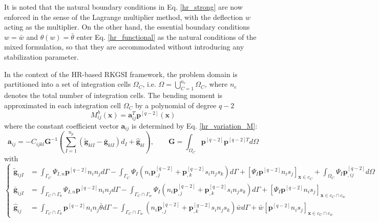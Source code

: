 It is noted that the natural boundary conditions in Eq. \eqref{hr_strong} are now enforced in the sense of the Lagrange multiplier method, with the deflection $w$ acting as the multiplier.
On the other hand, the essential boundary conditions $w=\bar w$ and $\theta(w)=\bar\theta$ enter Eq. \eqref{hr_functional} as the natural conditions of the mixed formulation, so that they are accommodated without introducing any stabilization parameter.

In the context of the HR-based RKGSI framework, the problem domain is partitioned into a set of integration cells $\Omega_C$, i.e. $\Omega=\bigcup_{C=1}^{n_e}\Omega_C$, where $n_e$ denotes the total number of integration cells.
The bending moment is approximated in each integration cell $\Omega_C$ by a polynomial of degree $q-2$
\begin{equation}\label{moment_approx}
	M^h_{ij}(\boldsymbol x)=\boldsymbol a_{ij}^{T}\boldsymbol p^{[q-2]}(\boldsymbol x)
\end{equation}
where the constant coefficient vector $\boldsymbol a_{ij}$ is determined by Eq. \eqref{hr_variation_M}:
\begin{equation}\label{moment_coef}
	\boldsymbol a_{ij}=-C_{ijkl}\boldsymbol G^{-1}\left(\sum_{I=1}^{n_p}\left(\tilde{\boldsymbol g}_{klI}-\bar{\boldsymbol g}_{klI}\right)d_I+\hat{\boldsymbol g}_{kl}\right),\qquad
	\boldsymbol G=\int_{\Omega_C}\boldsymbol p^{[q-2]}\boldsymbol p^{[q-2]T}d\Omega
\end{equation}
with
\begin{equation}\label{g_ij}
	\left\{
	\begin{aligned}
		\tilde{\boldsymbol g}_{ijI}&=\int_{\Gamma_C}\Psi_{I,n}\boldsymbol p^{[q-2]} n_i n_j d\Gamma
		-\int_{\Gamma_C}\Psi_I\left(n_i\boldsymbol p^{[q-2]}_{,j}+\boldsymbol p^{[q-2]}_{,k}s_i n_j s_k\right)d\Gamma
		+\left[\Psi_I\boldsymbol p^{[q-2]} n_i s_j\right]_{\boldsymbol x\in c_C}
		+\int_{\Omega_C}\Psi_I\boldsymbol p^{[q-2]}_{,ij}d\Omega \\
		\bar{\boldsymbol g}_{ijI}&=\int_{\Gamma_C\cap\Gamma_{\theta}}\Psi_{I,n}\boldsymbol p^{[q-2]} n_i n_j d\Gamma
		-\int_{\Gamma_C\cap\Gamma_{w}}\Psi_I\left(n_i\boldsymbol p^{[q-2]}_{,j}+\boldsymbol p^{[q-2]}_{,k}s_i n_j s_k\right)d\Gamma
		+\left[\Psi_I\boldsymbol p^{[q-2]} n_i s_j\right]_{\boldsymbol x\in c_C\cap c_w} \\
		\hat{\boldsymbol g}_{ij}&=\int_{\Gamma_C\cap\Gamma_{\theta}}\boldsymbol p^{[q-2]} n_i n_j \bar\theta d\Gamma
		-\int_{\Gamma_C\cap\Gamma_{w}}\left(n_i\boldsymbol p^{[q-2]}_{,j}+\boldsymbol p^{[q-2]}_{,k}s_i n_j s_k\right)\bar w d\Gamma
		+\bar w\left[\boldsymbol p^{[q-2]} n_i s_j\right]_{\boldsymbol x\in c_C\cap c_w}
	\end{aligned}
	\right.
\end{equation}
